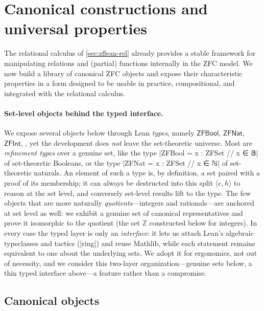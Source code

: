 \section{Canonical constructions and universal properties}
\label{sec:zflean-canon}

The relational calculus of \cref{sec:zflean-rel} already provides a stable framework for manipulating relations and (partial) functions internally in the ZFC model.
We now build a library of canonical ZFC objects and expose their characteristic properties in a form designed to be usable in practice, compositional, and integrated with the relational calculus.

\paragraph*{Set-level objects behind the typed interface.}
We expose several objects below through Lean \emph{types}, namely $\mathsf{ZFBool}$, $\mathsf{ZFNat}$, $\mathsf{ZFInt}$, \etc, yet the development does \emph{not} leave the set-theoretic universe.
Most are \emph{refinement types} over a genuine set, like the type \leaninl|ZFBool = {x : ZFSet // x ∈ 𝔹}| of set-theoretic Booleans, or the type \leaninl|ZFNat = {x : ZFSet // x ∈ ℕ}| of set-theoretic naturals.
An element of such a type is, by definition, a set paired with a proof of its membership; it can always be destructed into this split $\langle e, h\rangle$ to reason at the set level, and conversely set-level results lift to the type.
The few objects that are more naturally \emph{quotients}---integers and rationals---are anchored at set level as well: we exhibit a genuine set of canonical representatives and prove it isomorphic to the quotient (the set $\mathbb{Z}$ constructed below for integers).
In every case the typed layer is only an \emph{interface}: it lets us attach Lean's algebraic typeclasses and tactics (\eg \inlinelean|ring|) and reuse Mathlib, while each statement remains equivalent to one about the underlying sets.
We adopt it for ergonomics, not out of necessity, and we consider this two-layer organization---genuine sets below, a thin typed interface above---a feature rather than a compromise.

\subsection{Canonical objects}
